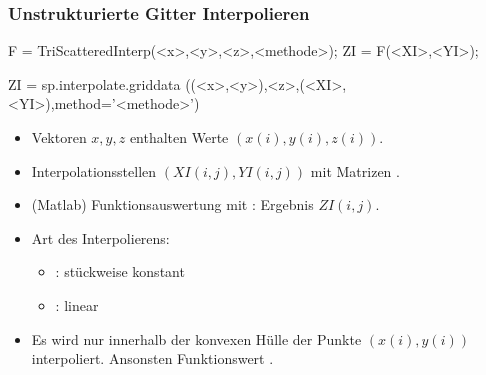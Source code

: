 \documentclass[hyperref={xetex}]{beamer}
\begin{document}
\begin{frame}[fragile]\frametitle{Unstrukturierte Gitter Interpolieren}
\begin{matlabin}
F = TriScatteredInterp(<x>,<y>,<z>,<methode>);
ZI = F(<XI>,<YI>);
\end{matlabin}
\begin{pyin}
ZI = sp.interpolate.griddata ((<x>,<y>),<z>,(<XI>,<YI>),method='<methode>')  
\end{pyin}
\begin{itemize}
\item Vektoren $x,y,z$ enthalten Werte $(x(i),y(i),z(i))$.
\item Interpolationsstellen $(XI(i,j),YI(i,j))$ mit Matrizen . 
\item (Matlab) Funktionsauswertung mit : Ergebnis $ZI(i,j)$.
\item Art des Interpolierens:
\begin{itemize}
 \item {}: st\"uckweise konstant
 \item {}: linear
\end{itemize}
\item Es wird nur innerhalb der konvexen H\"ulle der Punkte $(x(i),y(i))$
  interpoliert. Ansonsten Funktionswert . 
\end{itemize}
\end{frame}
\end{document}
